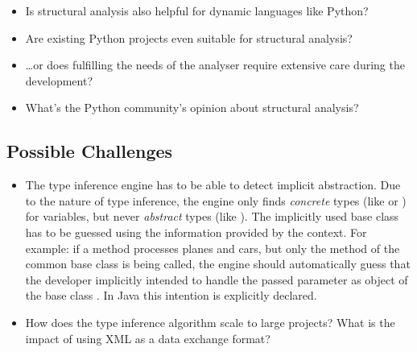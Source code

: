 \documentclass[12pt,halfparskip]{scrartcl}
\begin{document}
\begin{itemize}
	\item Is structural analysis also helpful for dynamic languages like Python?
	\item Are existing Python projects even suitable for structural analysis?
	\item \ldots or does fulfilling the needs of the analyser require extensive care during the development?
	\item What's the Python community's opinion about structural analysis?
\end{itemize}

\subsection*{Possible Challenges}

\begin{itemize}
	\item The type inference engine has to be able to detect implicit abstraction. Due to the nature of type inference, the engine only finds \emph{concrete} types (like  or ) for variables, but never \emph {abstract} types (like ). The implicitly used base class has to be guessed using the information provided by the context. For example: if a method processes planes and cars, but only the method  of the common base class  is being called, the engine should automatically guess that the developer implicitly intended to handle the passed parameter as object of the base class . In Java this intention is explicitly declared.
	\item How does the type inference algorithm scale to large projects? What is the impact of using XML as a data exchange format?
\end{itemize}
\end{document}
